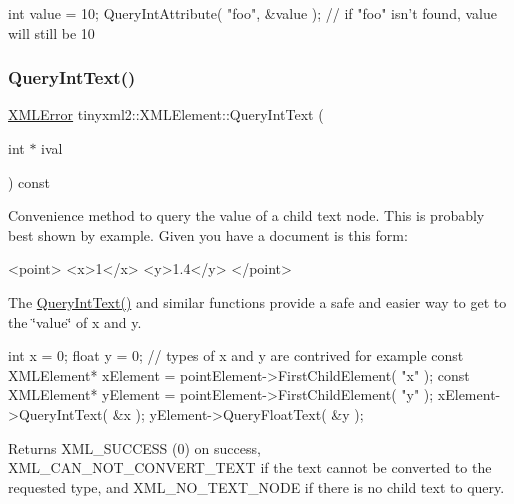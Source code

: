 \begin{DoxyVerb}int value = 10;
QueryIntAttribute( "foo", &value );     // if "foo" isn't found, value will still be 10
\end{DoxyVerb}
 \mbox{\label{classtinyxml2_1_1_x_m_l_element_a926357996bef633cb736e1a558419632}} 
\subsubsection{\texorpdfstring{Query\+Int\+Text()}{QueryIntText()}}
{\footnotesize\ttfamily \mbox{\hyperlink{namespacetinyxml2_a1fbf88509c3ac88c09117b1947414e08}{X\+M\+L\+Error}} tinyxml2\+::\+X\+M\+L\+Element\+::\+Query\+Int\+Text (\begin{DoxyParamCaption}\item[{int $\ast$}]{ival }\end{DoxyParamCaption}) const}

Convenience method to query the value of a child text node. This is probably best shown by example. Given you have a document is this form\+: \begin{DoxyVerb}    <point>
        <x>1</x>
        <y>1.4</y>
    </point>
\end{DoxyVerb}


The \mbox{\hyperlink{classtinyxml2_1_1_x_m_l_element_a926357996bef633cb736e1a558419632}{Query\+Int\+Text()}} and similar functions provide a safe and easier way to get to the \char`\"{}value\char`\"{} of x and y.

\begin{DoxyVerb}    int x = 0;
    float y = 0;    // types of x and y are contrived for example
    const XMLElement* xElement = pointElement->FirstChildElement( "x" );
    const XMLElement* yElement = pointElement->FirstChildElement( "y" );
    xElement->QueryIntText( &x );
    yElement->QueryFloatText( &y );
\end{DoxyVerb}


\begin{DoxyReturn}{Returns}
X\+M\+L\+\_\+\+S\+U\+C\+C\+E\+SS (0) on success, X\+M\+L\+\_\+\+C\+A\+N\+\_\+\+N\+O\+T\+\_\+\+C\+O\+N\+V\+E\+R\+T\+\_\+\+T\+E\+XT if the text cannot be converted to the requested type, and X\+M\+L\+\_\+\+N\+O\+\_\+\+T\+E\+X\+T\+\_\+\+N\+O\+DE if there is no child text to query. 
\end{DoxyReturn}
\mbox{\label{classtinyxml2_1_1_x_m_l_element_adb8ae765f98d0c5037faec48deea78bc}} 
